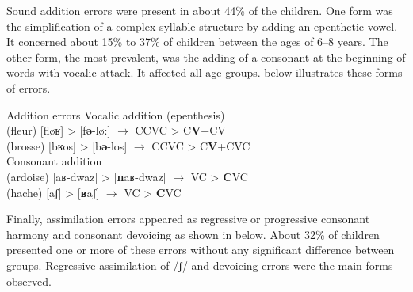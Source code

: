 \documentclass[output=paper,newtxmath,modfonts,nonflat,draftmode]{langsci/langscibook}
\begin{document}
Sound addition errors were present in about 44\% of the children. One form was the simplification of a complex syllable structure by adding an epenthetic vowel. It concerned about 15\% to 37\% of children between the ages of 6--8 years. The other form, the most prevalent, was the adding of a consonant at the beginning of words with vocalic attack. It affected all age groups.  below illustrates these forms of errors.

\ea Addition errors \label{ex:takam:addition_errors}
\ea Vocalic addition (epenthesis)\\
    (fleur) [fløʁ] > [f\textbf{ə}-lø:] $\rightarrow$ CCVC > C\textbf{V}+CV\\
    (brosse) [bʁos] > [b\textbf{ə}-los] $\rightarrow$ CCVC > C\textbf{V}+CVC\\
    \pagebreak
\ex Consonant addition\\
    (ardoise) [aʁ-dwaz] > [\textbf{n}aʁ-dwaz] $\rightarrow$ VC > \textbf{C}VC\\
(hache) [aʃ] > [\textbf{ʁ}aʃ] $\rightarrow$ VC > \textbf{C}VC\\
\z
\z

Finally, assimilation errors appeared as regressive or progressive consonant harmony and consonant devoicing as shown in  below. About 32\% of children presented one or more of these errors without any significant difference between groups. Regressive assimilation of /ʃ/ and devoicing errors were the main forms observed.
\end{document}
